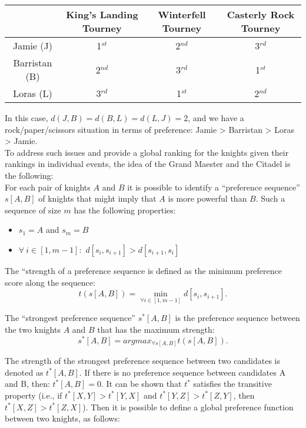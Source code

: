 \documentclass[11pt]{article}
\begin{document}
\begin{center}
\begin{tabular}{|c|c|c|c|}
\hline
& King's Landing Tourney  & Winterfell Tourney  & Casterly Rock
Tourney\\
\hline
Jamie (J) & 1$^{st}$ & 2$^{nd}$ & 3$^{rd}$\\
Barristan (B) & 2$^{nd}$ & 3$^{rd}$ & 1$^{st}$\\
Loras (L) & 3$^{rd}$ & 1$^{st}$ & 2$^{nd}$\\
\hline
\end{tabular}
\end{center}

\noindent In this case, $d(J,B) = d(B,L) = d(L,J) = 2$, and we have a
rock/paper/scissors situation in terms of preference: Jamie >
Barristan > Loras > Jamie. \\

\noindent To address such issues and provide a global ranking for the
knights given their rankings in individual events, the idea of the
Grand Maester and the Citadel is the following:\\

\noindent For each pair of knights $A$ and $B$ it is possible to
identify a ``preference sequence'' $s[A,B]$ of knights that might
imply that $A$ is more powerful than $B$. Such a sequence of size $m$
has the following properties:
\begin{itemize}
\item $s_1 = A$ and $s_m = B$
\item $\forall\ i \in [1,m-1]:$ $d[s_i,s_{i+1}] > d[s_{i+1},s_i]$
\end{itemize}
\noindent The ``strength of a preference sequence is defined as the
minimum preference score along the sequence: $$ t( s[A,B] ) =
\min_{\forall i \in [1,m-1]} d[s_i,s_{i+1}].$$ 

\noindent The ``strongest preference sequence'' $s^*[A,B]$ is the
preference sequence between the two knights $A$ and $B$ that has the
maximum strength:
$$s^*[A,B] = argmax_{\forall s[A,B]} t( s[A,B] ).$$ 

\noindent The strength of the strongest preference sequence between
two candidates is denoted as $t^*[A,B]$. If there is no preference
sequence between candidates A and B, then: $t^*[A,B] = 0$. It can be
shown that $t^*$ satisfies the transitive property (i.e., if $t^*[X,Y]
> t^*[Y,X]$ and $t^*[Y,Z] > t^*[Z,Y]$, then $t^*[X,Z] >
t^*[Z,X]$). Then it is possible to define a global preference function
between two knights, as follows:\vspace{-.2in}
\end{document}
